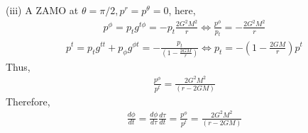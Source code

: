 \documentclass[12pt]{article}
\begin{document}
(iii) A ZAMO at $\theta = \pi/2, p^{r} = p^{\theta} = 0$, here,
\begin{align}
p^{\phi} = p_{t} g^{t \phi} = - p_{t} \frac{2 G^2 M^2}{r} \Leftrightarrow \frac{p^{\phi}}{p_{t}} = - \frac{2 G^2 M^2}{r}
\end{align}
\begin{align}
p^{t} = p_{t} g^{t t} + p_{\phi} g^{\phi t} = - \frac{p_{t}}{\left(1 - \frac{2 G M}{r} \right)} \Leftrightarrow p_{t} = - \left(1 - \frac{2 G M}{r} \right) p^{t}
\end{align}
Thus,
\begin{align}
\frac{p^{\phi}}{p^{t}} = \frac{2 G^2 M^2}{\left(r - 2GM \right)}
\end{align}
Therefore,
\begin{align}
\frac{d \phi}{d t} = \frac{d \phi}{d \tau} \frac{d \tau}{dt} = \frac{p^{\phi}}{p^{t}} = \frac{2 G^2 M^2}{\left(r - 2GM \right)}
\end{align}
\end{document}
